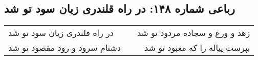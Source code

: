 \begin{center}
\section*{رباعی شماره ۱۴۸: در راه قلندری زیان سود تو شد}
\label{sec:sh148}
\begin{longtable}{l p{0.5cm} r}
در راه قلندری زیان سود تو شد
&&
زهد و ورع و سجاده مردود تو شد
\\
دشنام سرود و رود مقصود تو شد
&&
بپرست پیاله را که معبود تو شد
\\
\end{longtable}
\end{center}
